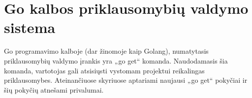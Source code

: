 \section{Go kalbos priklausomybių valdymo sistema}

Go programavimo kalboje (dar žinomoje kaip Golang), numatytasis priklausomybių valdymo įrankis yra „go get“
komanda. Naudodamasis šia komanda, vartotojas gali atsisiųsti vystomam projektui reikalingas priklausomybes.
Ateinančiuose skyriuose aptariami naujausi „go get“ pokyčiai ir šių pokyčių atnešami privalumai.






%
%
%
%
